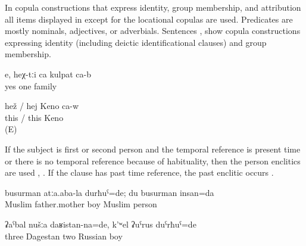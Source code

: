 In copula constructions that express identity, group membership, and attribution all items displayed in  except for the locational copulas are used. Predicates are mostly nominals, adjectives, or adverbials. Sentences ,  show copula constructions expressing identity (including deictic identificational clauses) and group membership. 
%
\begin{exe}
	\ex	\label{ex:Yes, they are one family}
	\gll	e,	heχ-tːi	ca	kulpat	ca-b\\
		yes		one	family		\\
	\glt	{}

	\ex	\label{ex:This is Zapir}
	\gll	hež	/	hej	Keno	ca-w\\
		this	/	this	Keno	\\
	\glt	{} (E)
\end{exe}

If the subject is first or second person and the temporal reference is present time or there is no temporal reference because of habituality, then the person enclitics are used , . If the clause has past time reference, the past enclitic occurs .
%
\begin{exe}
	\ex	\label{ex:‎I was the son of Muslim parents; I am a Muslim}
	\gll	busurman	atːa.aba-la	durħuˁ=de; du	busurman	insan=da\\
		Muslim father.mother	boy		Muslim	person		\\
	\glt	{}

	\ex	\label{ex:‎We three were from Daghestan, and there were two Russian guys}
	\gll	ʡaˁbal	nušːa	daʁistan-na=de,	k'ʷel	ʡuˁrus	duˁrħuˁ=de\\
		three		Dagestan	two	Russian	boy\\
	\glt	{}
\end{exe}


